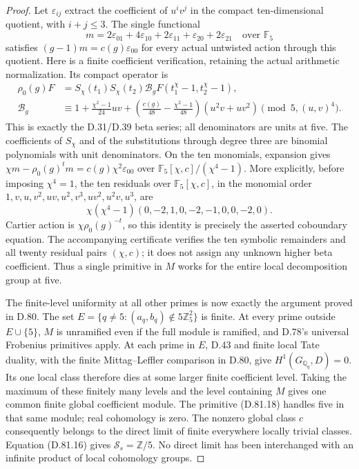 \begin{proof}
Let \(\varepsilon_{ij}\) extract the coefficient of \(u^iv^j\)
in the compact ten-dimensional quotient, with \(i+j\le3\).
The single functional
\[
 m=2\varepsilon_{01}+4\varepsilon_{10}
         +2\varepsilon_{11}+\varepsilon_{20}
         +2\varepsilon_{21}\quad\text{over }\mathbb F_5
                                                               \tag{D.81.18}
\]
satisfies \((g-1)m=c(g)\varepsilon_{00}\) for every actual
untwisted action through this quotient. Here is a finite
coefficient verification, retaining the actual arithmetic
normalization. Its compact operator is
\[
 \begin{split}
 \rho_0(g)F&=S_\chi(t_1)S_\chi(t_2)\mathcal B_g
                         F(t_1^\chi-1,t_2^\chi-1),\\
 \mathcal B_g&\equiv
  1+\frac{\chi^2-1}{24}uv
   +\left(\frac{c(g)}{48}-\frac{\chi^2-1}{48}\right)
                                  (u^2v+uv^2)
                 \pmod{5,(u,v)^4}.
 \end{split}                                                 \tag{D.81.19}
\]
This is exactly the D.31/D.39 beta series; all denominators
are units at five. The coefficients of \(S_\chi\) and of
the substitutions through degree three are binomial
polynomials with unit denominators. On the ten monomials,
expansion gives
\(\chi m-\rho_0(g)^t m=c(g)\chi^2\varepsilon_{00}\)
over \(\mathbb F_5[\chi,c]/(\chi^4-1)\).
More explicitly, before imposing \(\chi^4=1\), the ten
residuals over \(\mathbb F_5[\chi,c]\), in the monomial
order \(1,v,u,v^2,uv,u^2,v^3,uv^2,u^2v,u^3\), are
\[
 \chi(\chi^4-1)
             (0,-2,1,0,-2,-1,0,0,-2,0).
\]
Cartier action is \(\chi\rho_0(g)^{-t}\), so this identity
is precisely the asserted coboundary equation.
The accompanying certificate verifies the ten symbolic
remainders and all twenty residual pairs \((\chi,c)\);
it does not assign any unknown higher beta coefficient.
Thus a single primitive in \(M\) works for the entire
local decomposition group at five.

The finite-level uniformity at all other primes is now
exactly the argument proved in D.80. The set
\(E=\{q\ne5:(a_q,b_q)\notin5\mathbb Z_5^2\}\) is finite.
At every prime outside \(E\cup\{5\}\), \(M\) is unramified
even if the full module is ramified, and D.78's universal
Frobenius primitives apply. At each prime in \(E\),
D.43 and finite local Tate duality, with the finite
Mittag--Leffler comparison in D.80, give
\(H^1(G_{\mathbb Q_q},D)=0\). Its one local class therefore
dies at some larger finite coefficient level.
Taking the maximum of these finitely many levels and
the level containing \(M\) gives one common finite
global coefficient module. The primitive (D.81.18)
handles five in that same module; real cohomology is zero.
The nonzero global class \(c\) consequently belongs to
the direct limit of finite everywhere locally trivial
classes. Equation (D.81.16) gives
\(\mathcal S_s=\mathbb Z/5\).
No direct limit has been interchanged with an infinite
product of local cohomology groups.


\end{proof}
